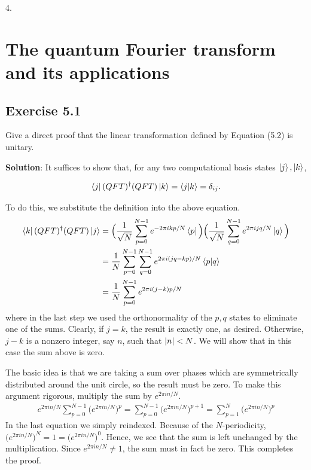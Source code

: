 \documentclass{book}
\begin{document}
    4.

    


\chapter{The quantum Fourier transform and its applications}


\section*{Exercise 5.1}
    Give a direct proof that the linear transformation defined by Equation (5.2) is unitary.
    
    \textbf{Solution}: It suffices to show that, for any two computational basis states $\ket{j}, \ket{k}$,
    
    \begin{align} \label{eq:5.1:QFT_unitary}
        \bra{j}(QFT)^\dagger(QFT)\ket{k} = \braket{j}{k} = \delta_{ij}.
    \end{align}
    
    To do this, we substitute the definition into the above equation. 
    \begin{align} \label{eq:5.1:expand_and_simplify}
    \begin{aligned}
        \bra{k}(QFT)^\dagger(QFT)\ket{j} &= \Big(\frac{1}{\sqrt{N}}\sum_{p=0}^{N-1}e^{-2\pi ikp/N}\bra{p}\Big)\Big(\frac{1}{\sqrt{N}}\sum_{q=0}^{N-1}e^{2\pi ijq/N}\ket{q}\Big) \\
        &= \frac{1}{N}\sum_{p=0}^{N-1}\sum_{q=0}^{N-1}e^{2\pi i(jq-kp)/N}\braket{p}{q} \\
        &= \frac{1}{N}\sum_{p=0}^{N-1} e^{2\pi i (j-k)p/N}
    \end{aligned}
    \end{align}
    where in the last step we used the orthonormality of the $p,q$ states to eliminate one of the sums. Clearly, if $j=k$, the result is exactly one, as desired. Otherwise, $j-k$ is a nonzero integer, say $n$, such that $\abs{n}<N$. We will show that in this case the sum above is zero. 
    
    The basic idea is that we are taking a sum over phases which are symmetrically distributed around the unit circle, so the result must be zero. To make this argument rigorous, multiply the sum by $e^{2\pi i n/N}$.
    \begin{align}
        e^{2\pi i n/N}\sum_{p=0}^{N-1}\big(e^{2\pi i n/N}\big)^p = \sum_{p=0}^{N-1}\big(e^{2\pi i n/N}\big)^{p+1} = \sum_{p=1}^{N}\big(e^{2\pi i n/N}\big)^{p}
    \end{align}
    In the last equation we simply reindexed. Because of the $N$-periodicity, $\big(e^{2\pi i n/N}\big)^N = 1 = \big(e^{2\pi i n/N}\big)^0$. Hence, we see that the sum is left unchanged by the multiplication. Since $e^{2\pi i n/N} \neq 1$, the sum must in fact be zero. This completes the proof.
\end{document}
